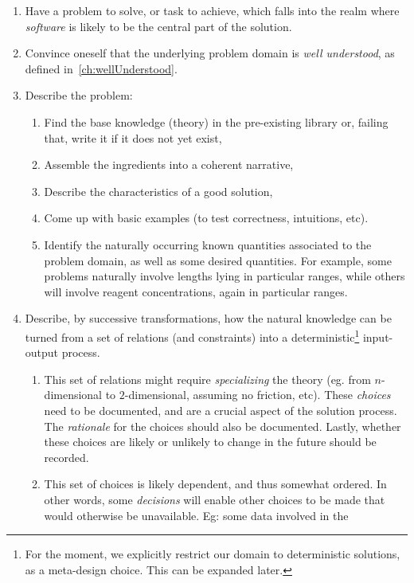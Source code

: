 \documentclass[sigconf,review]{acmart}
\begin{document}
\begin{enumerate}
\item\label{it:problem} Have a problem to solve, or task to achieve, which
falls into the realm where \emph{software} is likely to be the central part of
the solution.
\item\label{it:understood} Convince oneself that the underlying problem domain
is \emph{well understood}, as defined in~\autoref{ch:wellUnderstood}.
\item\label{it:probdesc} Describe the problem:
  \begin{enumerate}
  \item Find the base knowledge (theory) in the pre-existing library
    or, failing that, write it if it does not yet exist,
  \item Assemble the ingredients into a coherent narrative,
  \item Describe the characteristics of a good solution,
  \item Come up with basic examples (to test correctness, intuitions, etc).
  \item Identify the naturally occurring known quantities associated to the
    problem domain, as well as some desired quantities. For example,
    some problems naturally involve lengths lying in particular
    ranges, while others will involve reagent concentrations, again
    in particular ranges.
  \end{enumerate}
\item\label{it:refine} Describe, by successive transformations, how the natural
knowledge can be turned from a set of relations (and constraints) into a
deterministic\footnote{For the moment, we explicitly restrict our domain to
deterministic solutions, as a meta-design choice. This can be expanded later.}
input-output process.
  \begin{enumerate}
  \item This set of relations might require \emph{specializing} the
    theory (eg. from $n$-dimensional to $2$-dimensional, assuming no
    friction, etc).  These \emph{choices} need to be documented, and are
    a crucial aspect of the solution process. The \emph{rationale} for the
    choices should also be documented. Lastly, whether these choices are
    likely or unlikely to change in the future should be recorded.
  \item This set of choices is likely dependent, and thus somewhat ordered.
  In other words, some \emph{decisions} will enable other choices to be
  made that would otherwise be unavailable. Eg: some data involved in the

\end{enumerate}
\end{enumerate}
\end{document}
